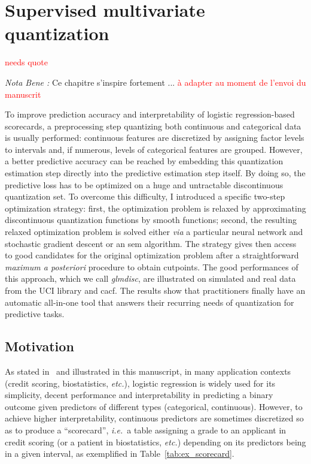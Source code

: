 \chapter{Supervised multivariate quantization} \label{chap4}

\minitoc

\textcolor{red}{needs quote}

\textit{Nota Bene :} Ce chapitre s'inspire fortement ... \textcolor{red}{à adapter au moment de l'envoi du manuscrit}

\bigskip


To improve prediction accuracy and interpretability of logistic regression-based scorecards, a preprocessing step quantizing both continuous and categorical data is usually performed: continuous features are discretized by assigning factor levels to intervals and, if numerous, levels of categorical features are grouped. However, a better predictive accuracy can be reached by embedding this quantization estimation step directly into the predictive estimation step itself. By doing so, the predictive loss has to be optimized on a huge and untractable discontinuous quantization set. To overcome this difficulty, I introduced a specific two-step optimization strategy: first, the optimization problem is relaxed by approximating discontinuous quantization functions by smooth functions; second, the resulting relaxed optimization problem is solved either \textit{via} a particular neural network and stochastic gradient descent or an \gls{sem} algorithm. The strategy gives then access to good candidates for the original optimization problem after a straightforward \textit{maximum a posteriori} procedure to obtain cutpoints. The good performances of this approach, which we call \textit{glmdisc}, are illustrated on simulated and real data from the UCI library and \gls{cacf}. The results show that practitioners finally have an automatic all-in-one tool that answers their recurring needs of quantization for predictive tasks.
 
\section{Motivation}

As stated in~\cite{hosmer2013applied} and illustrated in this manuscript, in many application contexts (credit scoring, biostatistics, {\it etc.}), logistic regression is widely used for its simplicity, decent performance and interpretability in predicting a binary outcome given predictors of different types (categorical, continuous). However, to achieve  higher interpretability, continuous predictors are sometimes discretized so as to produce a ``scorecard'', \textit{i.e.}\ a table assigning a grade to an applicant in credit scoring (or a patient in biostatistics, {\it etc.}) depending on its predictors being in a given interval, as exemplified in Table~\ref{tab:ex_scorecard}.

